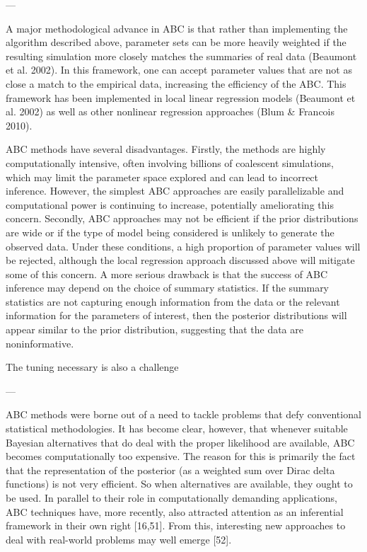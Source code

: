 ---

A major methodological advance in ABC is that rather than implementing the algorithm described above, parameter sets can be more heavily weighted if the resulting simulation more closely matches the summaries of real data (Beaumont et al. 2002). In this framework, one can accept parameter values that are not as close a match to the empirical data, increasing the efficiency of the ABC. This framework has been implemented in local linear regression models (Beaumont et al. 2002) as well as other nonlinear regression approaches (Blum \& Francois 2010). 

ABC methods have several disadvantages. Firstly, the methods are highly computationally intensive, often involving billions of coalescent simulations, which may limit the parameter space explored and can lead to incorrect inference. However, the simplest ABC approaches are easily parallelizable and computational power is continuing to increase, potentially ameliorating this concern. Secondly, ABC approaches may not be efficient if the prior distributions are wide or if the type of model being considered is unlikely to generate the observed data. Under these conditions, a high proportion of parameter values will be rejected, although the local regression  approach discussed above will mitigate some of this concern. A more serious drawback is that the success of ABC inference may depend on the choice of summary statistics. If the summary statistics are not capturing enough information from the data or the relevant information for the parameters of interest, then the posterior distributions will appear similar to the prior distribution, suggesting that the data are noninformative. 


The tuning necessary is also a challenge

---

ABC methods were borne out of a need to tackle problems that defy conventional statistical methodologies. It has become clear, however, that whenever suitable Bayesian alternatives that do deal with the proper likelihood are available, ABC becomes computationally too expensive. The reason for this is primarily the fact that the representation of the posterior (as a weighted sum over Dirac delta functions) is not very efficient. So when alternatives are available, they ought to be used. In parallel to their role in computationally demanding applications, ABC techniques have, more recently, also attracted attention as an inferential framework in their own right [16,51]. From this, interesting new approaches to deal with real-world problems may well emerge [52].

